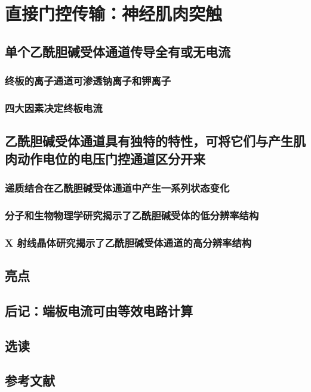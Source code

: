 \chapter{直接门控传输：神经肌肉突触}

\section{单个乙酰胆碱受体通道传导全有或无电流}
\subsection{终板的离子通道可渗透钠离子和钾离子}
\subsection{四大因素决定终板电流}

\section{乙酰胆碱受体通道具有独特的特性，可将它们与产生肌肉动作电位的电压门控通道区分开来}
\subsection{递质结合在乙酰胆碱受体通道中产生一系列状态变化}
\subsection{分子和生物物理学研究揭示了乙酰胆碱受体的低分辨率结构}
\subsection{X 射线晶体研究揭示了乙酰胆碱受体通道的高分辨率结构}

\section{亮点}

\section{后记：端板电流可由等效电路计算}

\section{选读}

\section{参考文献}